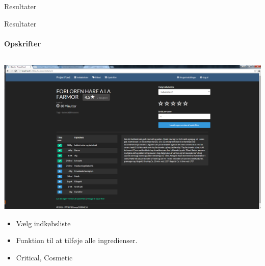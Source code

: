 \begin{frame}{Resultater}
\begin{minipage}[0.3\textheight]{\textwidth}
  \end{minipage}
  
  	
\end{frame}

\begin{frame}{Resultater}
\framesubtitle{Opskrifter}

	
	\begin{minipage}[0.3\textheight]{\textwidth}
	\begin{columns}[T]
	\begin{column}{1\textwidth}
	 \includegraphics[width=1\textwidth,height=1\textheight,keepaspectratio, trim={1cm 0 0 16mm}, clip]{images/Screenshots/PickedRecipeOld.png}
	 
		\begin{itemize}
		\item Vælg indkøbsliste
		\item Funktion til at tilføje alle ingredienser.
		\item Critical, Cosmetic
		\end{itemize}
	\end{column}

	\end{columns}

  \end{minipage}
	
\end{frame}
